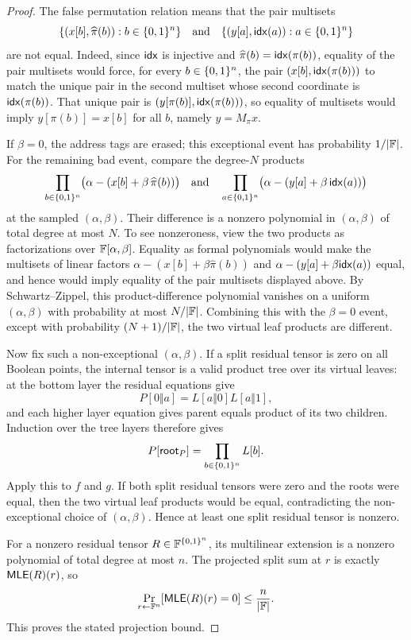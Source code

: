 \begin{proof}
The false permutation relation means that the pair multisets
\[
  \{(x[b],\widehat\pi(b)):b\in\{0,1\}^n\}
  \quad\text{and}\quad
  \{(y[a],\mathsf{idx}(a)):a\in\{0,1\}^n\}
\]
are not equal.  Indeed, since \(\mathsf{idx}\) is injective and
\(\widehat\pi(b)=\mathsf{idx}(\pi(b))\), equality of the pair multisets would force,
for every \(b\in\{0,1\}^n\), the pair
\((x[b],\mathsf{idx}(\pi(b)))\) to match the unique pair in the second multiset whose
second coordinate is \(\mathsf{idx}(\pi(b))\).  That unique pair is
\((y[\pi(b)],\mathsf{idx}(\pi(b)))\), so equality of multisets would imply
\(y[\pi(b)]=x[b]\) for all \(b\), namely \(y=M_\pi x\).

If \(\beta=0\), the address tags are erased; this exceptional
event has probability \(1/|\mathbb{F}|\).  For the remaining bad event, compare the
degree-\(N\) products
\[
  \prod_{b\in\{0,1\}^n}\bigl(\alpha-(x[b]+\beta\,\widehat\pi(b))\bigr)
  \quad\text{and}\quad
  \prod_{a\in\{0,1\}^n}\bigl(\alpha-(y[a]+\beta\,\mathsf{idx}(a))\bigr)
\]
at the sampled \((\alpha,\beta)\).  Their difference is a nonzero polynomial in
\((\alpha,\beta)\) of total degree at most \(N\).  To see nonzeroness, view the
two products as factorizations over \(\mathbb{F}[\alpha,\beta]\).  Equality as formal
polynomials would make the multisets of linear factors
\(\alpha-(x[b]+\beta\widehat\pi(b))\) and
\(\alpha-(y[a]+\beta\mathsf{idx}(a))\) equal, and hence would imply equality of the
pair multisets displayed above.  By
Schwartz--Zippel, this product-difference polynomial vanishes on a uniform
\((\alpha,\beta)\) with probability at most \(N/|\mathbb{F}|\).  Combining this with
the \(\beta=0\) event, except with probability \((N+1)/|\mathbb{F}|\), the two virtual
leaf products are different.

Now fix such a non-exceptional \((\alpha,\beta)\).  If a split residual tensor
is zero on all Boolean points, the internal tensor is a valid product tree over
its virtual leaves: at the bottom layer the residual equations give
\[
  P[0\Vert a]=L[a\Vert0]L[a\Vert1],
\]
and each higher layer equation gives parent equals product of its two children.
Induction over the tree layers therefore gives
\[
  P[\mathsf{root}_P]=\prod_{b\in\{0,1\}^n}L[b].
\]
Apply this to \(f\) and \(g\).  If both split residual tensors were zero and
the roots were equal, then the two virtual leaf products would be equal,
contradicting the non-exceptional choice of \((\alpha,\beta)\).  Hence at
least one split residual tensor is nonzero.

For a nonzero residual tensor \(R\in\mathbb{F}^{\{0,1\}^n}\), its multilinear extension is a
nonzero polynomial of total degree at most \(n\).  The projected split sum at
\(r\) is exactly \(\mathsf{MLE}(R)(r)\), so
\[
  \Pr_{r\leftarrow\mathbb{F}^n}[\mathsf{MLE}(R)(r)=0]\le\frac{n}{|\mathbb{F}|}.
\]
This proves the stated projection bound.
\end{proof}

